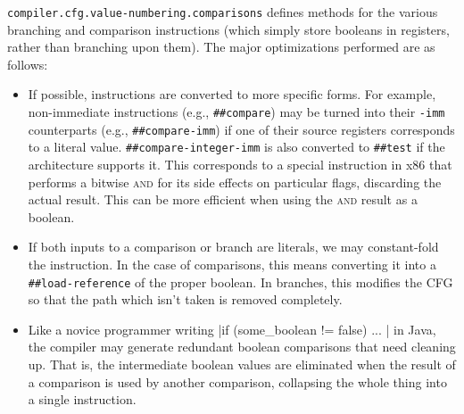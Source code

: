 \Verb|compiler.cfg.value-numbering.comparisons| defines methods for the various
branching and comparison instructions (which simply store booleans in
registers, rather than branching upon them).  The major optimizations performed
are as follows:
%
\begin{itemize}
%
\item If possible, instructions are converted to more specific forms.  For
example, non-immediate instructions (e.g., \Verb|##compare|) may be turned into
their \Verb|-imm| counterparts (e.g., \Verb|##compare-imm|)  if one of their
source registers corresponds to a literal value.  \Verb|##compare-integer-imm|
is also converted to \Verb|##test| if the architecture supports it.  This
corresponds to a special instruction in x86 that performs a bitwise
\textsc{and} for its side effects on particular flags, discarding the actual
result.  This can be more efficient when using the \textsc{and} result as a
boolean.
%
\item If both inputs to a comparison or branch are literals, we may
constant-fold the instruction.  In the case of comparisons, this means
converting it into a \Verb|##load-reference| of the proper boolean.  In
branches, this modifies the \gls{CFG} so that the path which isn't taken is
removed completely.
%
\item Like a novice programmer writing
%
|if (some_boolean != false) { ... }|
%
in Java, the compiler may generate redundant boolean comparisons that need
cleaning up.  That is, the intermediate boolean values are eliminated when the
result of a comparison is used by another comparison, collapsing the whole
thing into a single instruction.
%
\end{itemize}

